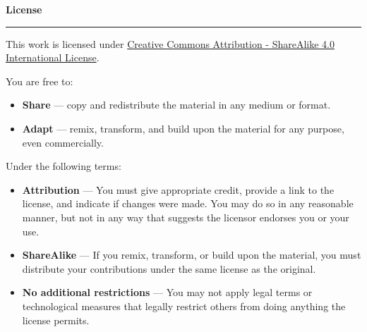% 
% 
% 
% 
% 

\thispagestyle{empty}

\hfill

\vfill

\textbf{License} \ccbysa
\par\vspace*{\dimexpr-\parskip-\baselineskip+6pt}
\noindent\rule{\textwidth}{0.5pt}


This work is licensed under \hyperlink{https://creativecommons.org/licenses/by-sa/4.0/legalcode}{Creative Commons Attribution - ShareAlike 4.0 International License}.

You are free to:
\begin{itemize}
	\item[] \textbf{Share} --- copy and redistribute the material in any medium or format.
	\item[] \textbf{Adapt} --- remix, transform, and build upon the material for any purpose, even commercially.
\end{itemize}

Under the following terms:
\begin{itemize}
	\item[\ccAttribution] \textbf{Attribution} --- You must give appropriate credit, provide a link to the license, and indicate if changes were made. You may do so in any reasonable manner, but not in any way that suggests the licensor endorses you or your use. 
	\item[\ccShareAlike] \textbf{ShareAlike} --- If you remix, transform, or build upon the material, you must distribute your contributions under the same license as the original.
	\item[] \textbf{No additional restrictions} --- You may not apply legal terms or technological measures that legally restrict others from doing anything the license permits.
\end{itemize}
\clearpage
